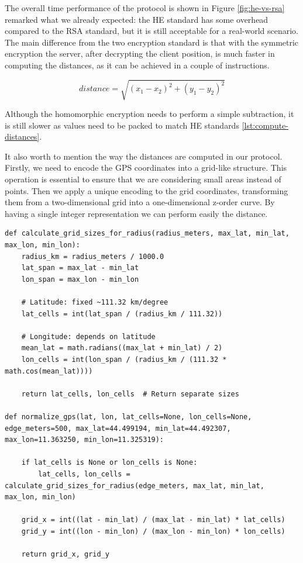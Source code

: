 The overall time performance of the protocol is shown in Figure \ref{fig:he-vs-rsa} remarked what we already expected: the HE standard has some overhead compared to the RSA standard, but it is still acceptable for a real-world scenario. The main difference from the two encryption standard is that with the symmetric encryption the server, after decrypting the client position, is much faster in computing the distances, as it can be achieved in a couple of instructions.

\[
    distance = \sqrt{(x_1 - x_2)^2 + (y_1 - y_2)^2}
\]

Although the homomorphic encryption needs to perform a simple subtraction, it is still slower as values need to be packed to match HE standards \ref{lst:compute-distances}.

It also worth to mention the way the distances are computed in our protocol. Firstly, we need to encode the GPS coordinates into a grid-like structure. This operation is essential to ensure that we are considering small areas instead of points. Then we apply a unique encoding to the grid coordinates, transforming them from a two-dimensional grid into a one-dimensional z-order curve. By having a single integer representation we can perform easily the distance.

\begin{lstlisting}[caption={Distance computation using z-order encoding}, label={lst:distance-computation}]
def calculate_grid_sizes_for_radius(radius_meters, max_lat, min_lat, max_lon, min_lon):
    radius_km = radius_meters / 1000.0
    lat_span = max_lat - min_lat
    lon_span = max_lon - min_lon
    
    # Latitude: fixed ~111.32 km/degree
    lat_cells = int(lat_span / (radius_km / 111.32))
    
    # Longitude: depends on latitude
    mean_lat = math.radians((max_lat + min_lat) / 2)
    lon_cells = int(lon_span / (radius_km / (111.32 * math.cos(mean_lat))))
    
    return lat_cells, lon_cells  # Return separate sizes

def normalize_gps(lat, lon, lat_cells=None, lon_cells=None, edge_meters=500, max_lat=44.499194, min_lat=44.492307, max_lon=11.363250, min_lon=11.325319):

    if lat_cells is None or lon_cells is None:
        lat_cells, lon_cells = calculate_grid_sizes_for_radius(edge_meters, max_lat, min_lat, max_lon, min_lon)
    
    grid_x = int((lat - min_lat) / (max_lat - min_lat) * lat_cells)
    grid_y = int((lon - min_lon) / (max_lon - min_lon) * lon_cells)
    
    return grid_x, grid_y
\end{lstlisting}

